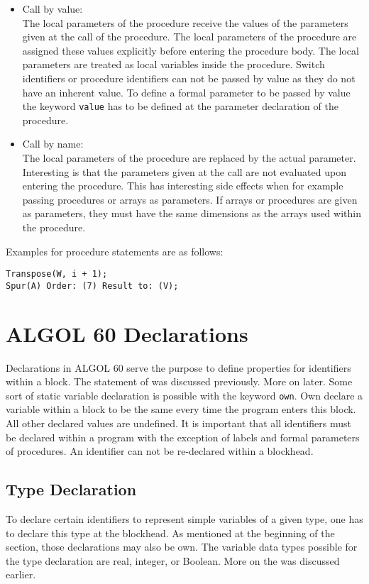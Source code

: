 \documentclass{article}
\begin{document}
\begin{itemize}
	\item Call by value:\\
	The local parameters of the procedure receive the values of the parameters given at the call of the procedure. The local parameters of the procedure are assigned these values explicitly before entering the procedure body. The local parameters are treated as local variables inside the procedure. Switch identifiers or procedure identifiers can not be passed by value as they do not have an inherent value. To define a formal parameter to be passed by value the keyword \texttt{value} has to be defined at the parameter declaration of the procedure.
	\item Call by name:\\
	The local parameters of the procedure are replaced by the actual parameter. Interesting is that the parameters given at the call are not evaluated upon entering the procedure. This has interesting side effects when for example passing procedures or arrays as parameters. If arrays or procedures are given as parameters, they must have the same dimensions as the arrays used within the procedure.
\end{itemize}

Examples for procedure statements are as follows:\\ 
\begin{lstlisting}[language={[60]algol}]
Transpose(W, i + 1);
Spur(A) Order: (7) Result to: (V);
\end{lstlisting}

\newpage

\section{ALGOL 60 Declarations}
Declarations in ALGOL 60 serve the purpose to define properties for identifiers within a block. The statement of  was discussed previously. More on  later. Some sort of static variable declaration is possible with the keyword \texttt{own}. Own declare a variable within a block to be the same every time the program enters this block. All other declared values are undefined. It is important that all identifiers must be declared within a program with the exception of labels and formal parameters of procedures. An identifier can not be re-declared within a blockhead. 

\subsection{Type Declaration} \label{typeDecl}
To declare certain identifiers to represent simple variables of a given type, one has to declare this type at the blockhead. As mentioned at the beginning of the section, those declarations may also be own. The variable data types possible for the type declaration are real, integer, or Boolean. More on the  was discussed earlier.\\
\end{document}
